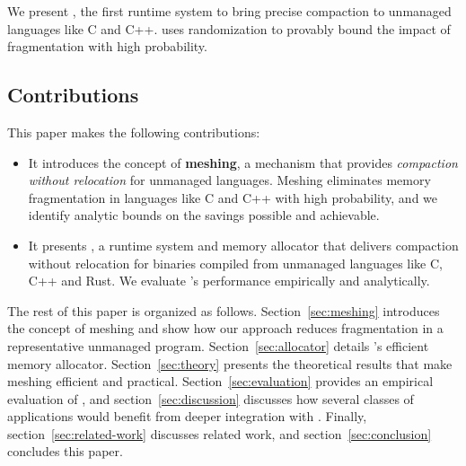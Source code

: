 We present \Mesh, the first runtime system to bring precise compaction
to unmanaged languages like C and C++.  \Mesh uses randomization to
provably bound the impact of fragmentation with high probability.

\subsection{Contributions}
\label{sec:contributions}

This paper makes the following contributions:

\begin{itemize}
\item It introduces the concept of \textbf{meshing}, a mechanism that
  provides \textit{compaction without relocation} for unmanaged
  languages.  Meshing eliminates memory fragmentation in languages
  like C and C++ with high probability, and we identify analytic
  bounds on the savings possible and achievable.
\item It presents \textbf{\Mesh}, a runtime system and memory
  allocator that delivers compaction without relocation for binaries
  compiled from unmanaged languages like C, C++ and Rust.  We evaluate
  \Mesh's performance empirically and analytically.
\end{itemize}

The rest of this paper is organized as follows.
Section~\ref{sec:meshing} introduces the concept of meshing and show
how our approach reduces fragmentation in a representative unmanaged
program.  Section~\ref{sec:allocator} details \Mesh's efficient memory
allocator.  Section~\ref{sec:theory} presents the theoretical results
that make meshing efficient and
practical. Section~\ref{sec:evaluation} provides an empirical
evaluation of \Mesh, and section~\ref{sec:discussion} discusses how
several classes of applications would benefit from deeper integration
with \Mesh.  Finally, section~\ref{sec:related-work} discusses related
work, and section~\ref{sec:conclusion} concludes this paper.
